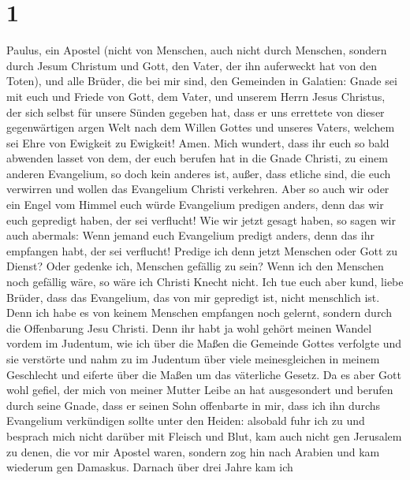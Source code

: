 \hypertarget{section}{%
\section{1}\label{section}}

 Paulus, ein Apostel (nicht von Menschen, auch nicht durch
Menschen, sondern durch Jesum Christum und Gott, den Vater, der ihn
auferweckt hat von den Toten),  und alle Brüder, die bei mir
sind, den Gemeinden in Galatien:  Gnade sei mit euch und
Friede von Gott, dem Vater, und unserem Herrn Jesus Christus,
 der sich selbst für unsere Sünden gegeben hat, dass er uns
errettete von dieser gegenwärtigen argen Welt nach dem Willen Gottes und
unseres Vaters,  welchem sei Ehre von Ewigkeit zu Ewigkeit!
Amen.  Mich wundert, dass ihr euch so bald abwenden lasset
von dem, der euch berufen hat in die Gnade Christi, zu einem anderen
Evangelium,  so doch kein anderes ist, außer, dass etliche
sind, die euch verwirren und wollen das Evangelium Christi verkehren.
 Aber so auch wir oder ein Engel vom Himmel euch würde
Evangelium predigen anders, denn das wir euch gepredigt haben, der sei
verflucht!  Wie wir jetzt gesagt haben, so sagen wir auch
abermals: Wenn jemand euch Evangelium predigt anders, denn das ihr
empfangen habt, der sei verflucht!  Predige ich denn jetzt
Menschen oder Gott zu Dienst? Oder gedenke ich, Menschen gefällig zu
sein? Wenn ich den Menschen noch gefällig wäre, so wäre ich Christi
Knecht nicht.  Ich tue euch aber kund, liebe Brüder, dass
das Evangelium, das von mir gepredigt ist, nicht menschlich ist.
 Denn ich habe es von keinem Menschen empfangen noch
gelernt, sondern durch die Offenbarung Jesu Christi.  Denn
ihr habt ja wohl gehört meinen Wandel vordem im Judentum, wie ich über
die Maßen die Gemeinde Gottes verfolgte und sie verstörte 
und nahm zu im Judentum über viele meinesgleichen in meinem Geschlecht
und eiferte über die Maßen um das väterliche Gesetz.  Da es
aber Gott wohl gefiel, der mich von meiner Mutter Leibe an hat
ausgesondert und berufen durch seine Gnade,  dass er seinen
Sohn offenbarte in mir, dass ich ihn durchs Evangelium verkündigen
sollte unter den Heiden: alsobald fuhr ich zu und besprach mich nicht
darüber mit Fleisch und Blut,  kam auch nicht gen Jerusalem
zu denen, die vor mir Apostel waren, sondern zog hin nach Arabien und
kam wiederum gen Damaskus.  Darnach über drei Jahre kam ich
